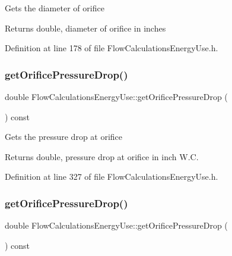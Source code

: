Gets the diameter of orifice

\begin{DoxyReturn}{Returns}
double, diameter of orifice in inches 
\end{DoxyReturn}


Definition at line 178 of file Flow\+Calculations\+Energy\+Use.\+h.

\mbox{\label{class_flow_calculations_energy_use_ac42e5918bba0c56406f39437317a2a87}} 
\subsubsection{\texorpdfstring{get\+Orifice\+Pressure\+Drop()}{getOrificePressureDrop()}\hspace{0.1cm}{\footnotesize\ttfamily [1/3]}}
{\footnotesize\ttfamily double Flow\+Calculations\+Energy\+Use\+::get\+Orifice\+Pressure\+Drop (\begin{DoxyParamCaption}{ }\end{DoxyParamCaption}) const\hspace{0.3cm}{\ttfamily [inline]}}

Gets the pressure drop at orifice

\begin{DoxyReturn}{Returns}
double, pressure drop at orifice in inch W.\+C. 
\end{DoxyReturn}


Definition at line 327 of file Flow\+Calculations\+Energy\+Use.\+h.

\mbox{\label{class_flow_calculations_energy_use_ac42e5918bba0c56406f39437317a2a87}} 
\subsubsection{\texorpdfstring{get\+Orifice\+Pressure\+Drop()}{getOrificePressureDrop()}\hspace{0.1cm}{\footnotesize\ttfamily [2/3]}}
{\footnotesize\ttfamily double Flow\+Calculations\+Energy\+Use\+::get\+Orifice\+Pressure\+Drop (\begin{DoxyParamCaption}{ }\end{DoxyParamCaption}) const\hspace{0.3cm}{\ttfamily [inline]}}

